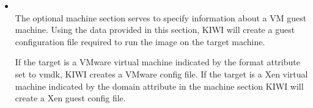 \begin{itemize}
	\begin{Command}{12cm}
	<split>\\
	\hspace*{1cm}<temporary>\\
	\hspace*{2cm}<!-- read/write access to: -->\\
	\hspace*{2cm}<file name="/var"/>\\
	\hspace*{2cm}<file name="/var/*"/>\\
	\hspace*{2cm}<!-- but not on this file: -->\\
	\hspace*{2cm}<except name="/etc/shadow"/>\\
	\hspace*{1cm}</temporary>\\
	\hspace*{1cm}<persistent>\\
	\hspace*{2cm}<!-- persistent read/write access to: -->\\
	\hspace*{2cm}<file name="/etc"/>\\
	\hspace*{2cm}<file name="/etc/*"/>\\
	\hspace*{2cm}<!-- but not on this file: -->\\
	\hspace*{2cm}<except name="/etc/passwd"/>\\
	\hspace*{1cm}</persistent>\\
	</split>
	\end{Command}

    Use the  element to specify exceptions to previously
    configured rules.

\item {}\\
    The optional machine section serves to specify information
    about a VM guest machine. Using the data provided in this section,
    KIWI will create a guest configuration file required to run the
    image on the target machine.

    If the target is a VMware virtual machine indicated by the
    format attribute set to vmdk, KIWI creates a VMware config file.
    If the target is a Xen virtual machine indicated by the domain
    attribute in the machine section KIWI will create a Xen guest
    config file.


\end{itemize}
